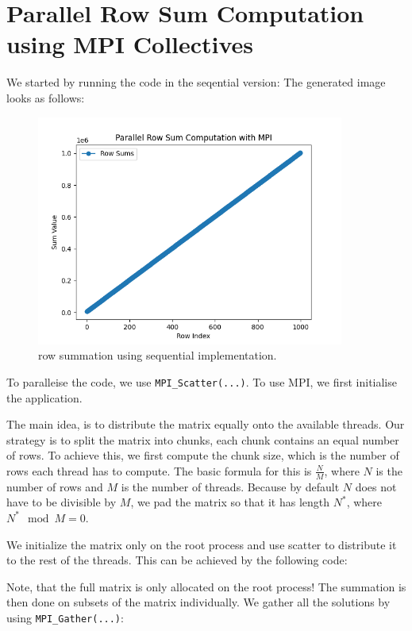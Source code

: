 \documentclass[a4paper,10pt]{article}
\begin{document}
\section{Parallel Row Sum Computation using MPI Collectives}
We started by running the code in the seqential version:
The generated image looks as follows:
\begin{figure}[H]
  \centering
  \includegraphics[width=0.9\textwidth]{img/ex2_seq}
  \caption{row summation using sequential implementation.}
  \label{fig:ex2_seq}
\end{figure}

To paralleise the code, we use \verb|MPI_Scatter(...)|.
To use MPI, we first initialise the application.



The main idea, is to distribute the matrix equally onto the available threads.
Our strategy is to split the matrix into chunks, each chunk contains an equal number of rows.
To achieve this, we first compute the chunk size, which is the number of rows each thread has to compute.
The basic formula for this is $\frac{N}{M}$, where $N$ is the number of rows and $M$ is the number of threads.
Because by default $N$ does not have to be divisible by $M$, we pad the matrix so that it has length $N^*$, where $N^* \mod M = 0$.

We initialize the matrix only on the root process and use scatter to distribute it to the rest of the threads.
This can be achieved by the following code:

Note, that the full matrix is only allocated on the root process!
The summation is then done on subsets of the matrix individually.
We gather all the solutions by using \verb|MPI_Gather(...)|:

\end{document}
